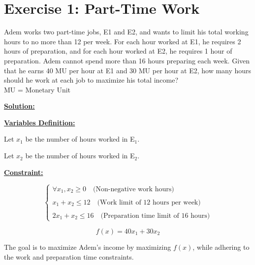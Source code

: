 \section{Exercise 1: Part-Time Work}
Adem works two part-time jobs, E1 and E2, and wants to limit his total working hours to no more than 12 per week. For each hour worked
at E1, he requires 2 hours of preparation, and for each hour worked at E2, he requires 1 hour of preparation. Adem cannot spend
more than 16 hours preparing each week. Given that he earns 40 MU per hour at E1 and 30 MU per hour at E2, how many hours should
he work at each job to maximize his total income?\\
MU = Monetary Unit

\vspace{1.5cm}
\textbf{\underline{\Large Solution:}}
\begin{multicols}{2}
\textbf{\underline{Variables Definition:}}

Let \(x_1\) be the number of hours worked in E$_{1}$.

Let \(x_2\) be the number of hours worked in E$_{2}$.
\columnbreak

\textbf{\underline{Constraint:}} 

\[
\left\{
    \begin{array}{l}
       \forall x_1, x_2 \geq 0 \quad \text{(Non-negative work hours)}\\\\
        x_1 + x_2 \leq 12 \quad \text{(Work limit of 12 hours per week)}\\\\
        2x_1 + x_2 \leq 16 \quad \text{(Preparation time limit of 16 hours)}
   \end{array}
   \right.
\] 
\end{multicols}
\vspace{0.5cm}
\begin{tcolorbox}[title = Objectif Function]
\[
f(x) = 40x_1 + 30x_2 
\]
\begin{center}
The goal is to maximize Adem's income by maximizing \(f(x)\), while adhering to the work and preparation time constraints.
\end{center}
\end{tcolorbox}
